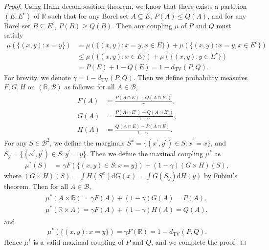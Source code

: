 \documentclass{article}
\numberwithin{equation}{section}
\begin{document}
\begin{proof}
Using Hahn decomposition theorem, we know that there exists a partition $(E,E^c)$ of $\mathbb{R}$ such that for any Borel set $A\subseteq E$, $P(A)\leq Q(A)$, and for any Borel set $B\subseteq E^c$, $P(B)\geq Q(B).$ Then any coupling $\mu$ of $P$ and $Q$ must satisfy
\begin{align*}
	\mu(\{(x,y):x=y\}) &= \mu(\{(x,y):x=y,x\in E\}) + \mu(\{(x,y):x=y,x\in E^c\})\\
	&\leq \mu(\{(x,y):x\in E\}) + \mu(\{(x,y):y\in E^c\})\\
	&= P(E) + 1 - Q(E) = 1-d_\mathrm{TV}(P,Q).\tag{6.30}\label{6.30}
\end{align*}
For brevity, we denote $\gamma = 1-d_\mathrm{TV}(P,Q).$ Then we define probability measures $F,G,H$ on $(\mathbb{R},\mathcal{B})$ as follows: for all $A\in\mathcal{B}$,
\begin{align*}
	\begin{aligned}
		F(A) &= \frac{P(A\cap E) + Q(A\cap E^c)}{\gamma},\\
		G(A) &= \frac{P(A\cap E^c) - Q(A\cap E^c)}{1-\gamma},\\
		H(A) &= \frac{Q(A\cap E) - P(A\cap E)}{1-\gamma}.
	\end{aligned}\tag{6.31}
\end{align*}
For any $S\in\mathcal{B}^2$, we define the marginals $S^x = \{(x^\prime,y^\prime)\in S:x^\prime = x\}$, and $S_y = \{(x^\prime,y^\prime)\in S:y^\prime = y\}$. Then we define the maximal coupling $\mu^*$ as
\begin{align*}
	\mu^*(S) &= \gamma F(\{(x,y)\in S:x=y\}) + (1-\gamma)(G\times H)(S),\tag{6.32}
\end{align*}
where $(G\times H)(S) = \int H(S^x)\mathrm{d}G(x) = \int G(S_y)\mathrm{d}H(y)$ by Fubini's theorem. Then for all $A\in\mathcal{B}$,
\begin{align*}
	\begin{aligned}
	\mu^*(A\times\mathbb{R}) = \gamma F(A) + (1-\gamma) G(A) = P(A),\\
	\mu^*(\mathbb{R}\times A) = \gamma F(A) + (1-\gamma) H(A) = Q(A),
	\end{aligned}\tag{6.33}
\end{align*}
and
\begin{align*}
	\mu^*(\{(x,y):x=y\}) = \gamma F(\mathbb{R}) = 1 - d_\mathrm{TV}(P,Q).\tag{6.34}
\end{align*}
Hence $\mu^*$ is a valid maximal coupling of $P$ and $Q$, and we complete the proof.
\end{proof}
\end{document}

